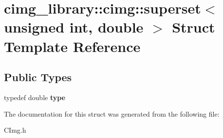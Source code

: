 \hypertarget{structcimg__library_1_1cimg_1_1superset_3_01unsigned_01int_00_01double_01_4}{\section{cimg\-\_\-library\-:\-:cimg\-:\-:superset$<$ unsigned int, double $>$ Struct Template Reference}
\label{structcimg__library_1_1cimg_1_1superset_3_01unsigned_01int_00_01double_01_4}
}
\subsection*{Public Types}
\begin{DoxyCompactItemize}
\item 
\hypertarget{structcimg__library_1_1cimg_1_1superset_3_01unsigned_01int_00_01double_01_4_a6e59bc503c7907d56ab089f27efdbf1d}{typedef double {\bfseries type}}\label{structcimg__library_1_1cimg_1_1superset_3_01unsigned_01int_00_01double_01_4_a6e59bc503c7907d56ab089f27efdbf1d}

\end{DoxyCompactItemize}


The documentation for this struct was generated from the following file\-:\begin{DoxyCompactItemize}
\item 
C\-Img.\-h\end{DoxyCompactItemize}
